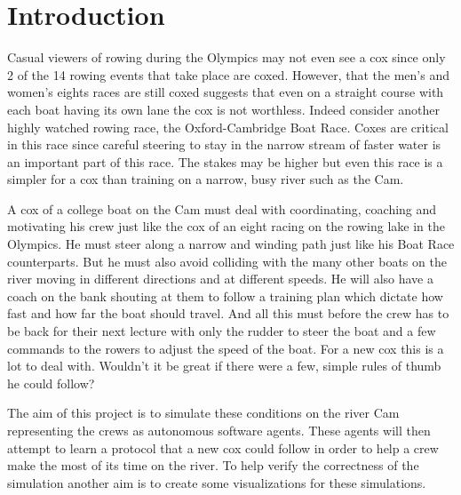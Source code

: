 \chapter{Introduction}
Casual viewers of rowing during the Olympics may not even see a cox since only 2 of the 14 rowing events that take place are coxed. However, that the men's and women's eights races are still coxed suggests that even on a straight course with each boat having its own lane the cox is not worthless. Indeed consider another highly watched rowing race, the Oxford-Cambridge Boat Race. Coxes are critical in this race since careful steering to stay in the narrow stream of faster water is an important part of this race. The stakes may be higher but even this race is a simpler for a cox than training on a narrow, busy river such as the Cam.

A cox of a college boat on the Cam must deal with coordinating, coaching and motivating his crew just like the cox of an eight racing on the rowing lake in the Olympics. He must steer along a narrow and winding path just like his Boat Race counterparts. But he must also avoid colliding with the many other boats on the river moving in different directions and at different speeds. He will also have a coach on the bank shouting at them to follow a training plan which dictate how fast and how far the boat should travel. And all this must before the crew has to be back for their next lecture with only the rudder to steer the boat and a few commands to the rowers to adjust the speed of the boat. For a new cox this is a lot to deal with. Wouldn't it be great if there were a few, simple rules of thumb he could follow?

The aim of this project is to simulate these conditions on the river Cam representing the crews as autonomous software agents. These agents will then attempt to learn a protocol that a new cox could follow in order to help a crew make the most of its time on the river. To help verify the correctness of the simulation another aim is to create some visualizations for these simulations.
